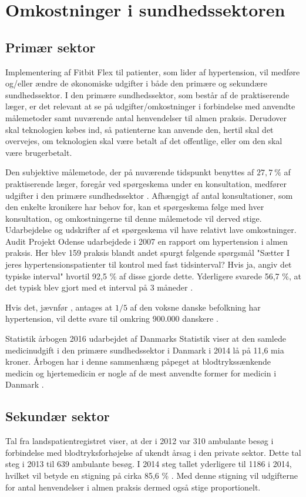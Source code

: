 \section{Omkostninger i sundhedssektoren}

\subsection{Primær sektor}
Implementering af Fitbit Flex til patienter, som lider af hypertension, vil medføre og/eller ændre de økonomiske udgifter i både den primære og sekundære sundhedssektor. I den primære sundhedssektor, som består af de praktiserende læger, er det relevant at se på udgifter/omkostninger i forbindelse med anvendte målemetoder samt nuværende antal henvendelser til almen praksis. Derudover skal teknologien købes ind, så patienterne kan anvende den, hertil skal det overvejes, om teknologien skal være betalt af det offentlige, eller om den skal være brugerbetalt.

Den subjektive målemetode, der på nuværende tidspunkt benyttes af $27,7~\%$ af praktiserende læger, foregår ved spørgeskema under en konsultation, medfører udgifter i den primære sundhedssektor \citep{munck2007}. Afhængigt af antal konsultationer, som den enkelte kronikere har behov for, kan et spørgeskema følge med hver konsultation, og omkostningerne til denne målemetode vil derved stige. Udarbejdelse og udskrifter af et spørgeskema vil have relativt lave omkostninger.
Audit Projekt Odense udarbejdede i 2007 en rapport om hypertension i almen praksis. Her blev 159 praksis blandt andet spurgt følgende spørgsmål "Sætter I jeres hypertensionspatienter til kontrol med fast tidsinterval? Hvis ja, angiv det typiske interval" hvortil 92,5 \% af disse gjorde dette. Yderligere svarede 56,7 \%, at det typisk blev gjort med et interval på 3 måneder \citep{munck2007}. 

Hvis det, jævnfør \citeauthor{kronborg2008}, antages at $1/5$ af den voksne danske befolkning har hypertension, vil dette svare til omkring 900.000 danskere \citep{folketal2016}.

Statistik årbogen 2016 udarbejdet af Danmarks Statistik viser at den samlede medicinudgift i den primære sundhedssektor i Danmark i 2014 lå på 11,6 mia kroner. Årbogen har i denne sammenhæng påpeget at blodtrykssænkende medicin og hjertemedicin er nogle af de mest anvendte former for medicin i Danmark \citep{dst2016}. 

\subsection{Sekundær sektor}
Tal fra landspatientregistret viser, at der i 2012 var 310 ambulante besøg i forbindelse med blodtryksforhøjelse af ukendt årsag i den private sektor. Dette tal steg i 2013 til 639 ambulante besøg. I 2014 steg tallet yderligere til 1186 i 2014, hvilket vil betyde en stigning på cirka 85,6 \% \citep{sundhedsdatastyrelsen2016} . Med denne stigning vil udgifterne for antal henvendelser i almen praksis dermed også stige proportionelt. 
